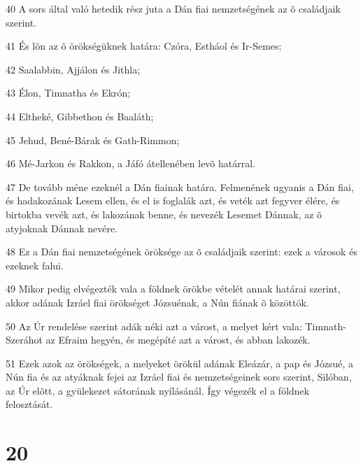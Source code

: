 \par 40 A sors által való hetedik rész juta a Dán fiai nemzetségének az õ családjaik szerint.
\par 41 És lõn az õ örökségüknek határa: Czóra, Estháol és Ir-Semes;
\par 42 Saalabbin, Ajjálon és Jithla;
\par 43 Élon, Timnatha és Ekrón;
\par 44 Eltheké, Gibbethon és Baaláth;
\par 45 Jehud, Bené-Bárak és Gath-Rimmon;
\par 46 Mé-Jarkon és Rakkon, a Jáfó átellenében levõ határral.
\par 47 De tovább méne ezeknél a Dán fiainak határa. Felmenének ugyanis a Dán fiai, és hadakozának Lesem ellen, és el is foglalák azt, és veték azt fegyver élére, és birtokba vevék azt, és lakozának benne, és nevezék Lesemet Dánnak, az õ atyjoknak Dánnak nevére.
\par 48 Ez a Dán fiai nemzetségének öröksége az õ családjaik szerint: ezek a városok és ezeknek falui.
\par 49 Mikor pedig elvégezték vala a földnek örökbe vételét annak határai szerint, akkor adának Izráel fiai örökséget Józsuénak, a Nún fiának õ közöttök.
\par 50 Az Úr rendelése szerint adák néki azt a várost, a melyet kért vala: Timnath-Szeráhot az Efraim hegyén, és megépíté azt a várost, és abban lakozék.
\par 51 Ezek azok az örökségek, a melyeket örökül adának Eleázár, a pap és Józsué, a Nún fia és az atyáknak fejei az Izráel fiai és nemzetségeinek sors szerint, Silóban, az Úr elõtt, a gyülekezet sátorának nyílásánál. Így végezék el a földnek felosztását.

\chapter{20}

